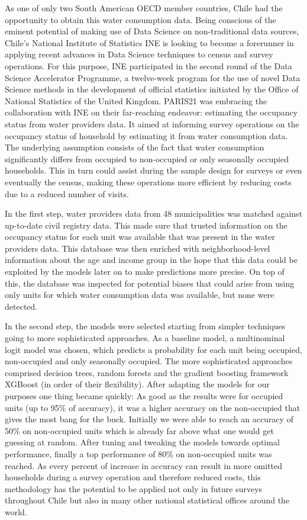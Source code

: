 \documentclass[
]{article}
\begin{document}
As one of only two South American OECD member countries, Chile had the opportunity to obtain this water consumption data. Being conscious of the eminent potential of making use of Data Science on non-traditional data sources, Chile's National Institute of Statistics INE is looking to become a forerunner in applying recent advances in Data Science techniques to census and survey operations. For this purpose, INE participated in the second round of the Data Science Accelerator Programme, a twelve-week program for the use of novel Data Science methods in the development of official statistics initiated by the Office of National Statistics of the United Kingdom. PARIS21 was embracing the collaboration with INE on their far-reaching endeavor: estimating the occupancy status from water providers data. It aimed at informing survey operations on the occupancy status of household by estimating it from water consumption data. The underlying assumption consists of the fact that water consumption significantly differs from occupied to non-occupied or only seasonally occupied households. This in turn could assist during the sample design for surveys or even eventually the census, making these operations more efficient by reducing costs due to a reduced number of visits.

In the first step, water providers data from 48 municipalities was matched against up-to-date civil registry data. This made sure that trusted information on the occupancy status for each unit was available that was present in the water providers data. This database was then enriched with neighborhood-level information about the age and income group in the hope that this data could be exploited by the models later on to make predictions more precise. On top of this, the database was inspected for potential biases that could arise from using only units for which water consumption data was available, but none were detected.

In the second step, the models were selected starting from simpler techniques going to more sophisticated approaches. As a baseline model, a multinominal logit model was chosen, which predicts a probability for each unit being occupied, non-occupied and only seasonally occupied. The more sophisticated approaches comprised decision trees, random forests and the gradient boosting framework XGBoost (in order of their flexibility). After adapting the models for our purposes one thing became quickly: As good as the results were for occupied units (up to 95\% of accuracy), it was a higher accuracy on the non-occupied that gives the most bang for the buck. Initially we were able to reach an accuracy of 50\% on non-occupied units which is already far above what one would get guessing at random. After tuning and tweaking the models towards optimal performance, finally a top performance of 80\% on non-occupied units was reached. As every percent of increase in accuracy can result in more omitted households during a survey operation and therefore reduced costs, this methodology has the potential to be applied not only in future surveys throughout Chile but also in many other national statistical offices around the world.
\end{document}
